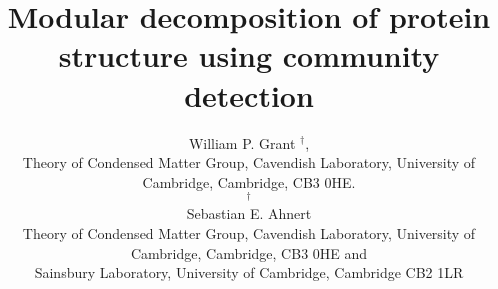 \documentclass[a4paper,numbib, final, twoside, titelpage]{imaiai}%
\begin{document}
\title{Modular decomposition of protein structure using community detection}



\author{{%
\sc William P. Grant}
$^\dagger$,\\[2pt]
Theory of Condensed Matter Group, Cavendish Laboratory, University of Cambridge, Cambridge, CB3 0HE.\\
$^\dagger${}\\[10pt]
{\sc Sebastian E. Ahnert}\\[2pt]
Theory of Condensed Matter Group, Cavendish Laboratory, University of Cambridge, Cambridge, CB3 0HE and\\
Sainsbury Laboratory, University of Cambridge, Cambridge CB2 1LR}



\maketitle
\end{document}
